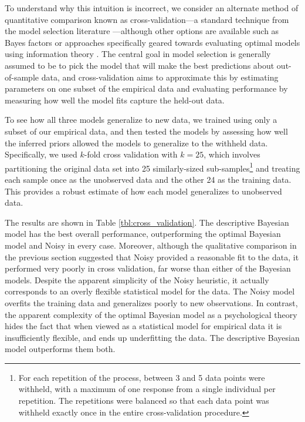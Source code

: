 To understand why this intuition is incorrect, we consider an alternate method of quantitative comparison known as cross-validation---a standard technique from the model selection literature \cite{browne_cross-validation_2000}---although other options are available such as Bayes factors \cite{wasserman2000bayesian} or approaches specifically geared towards evaluating optimal models using information theory \cite{shen2016}. The central goal in model selection is generally assumed to be to pick the model that will make the best predictions about out-of-sample data, and cross-validation aims to approximate this by estimating parameters on one subset of the empirical data and evaluating performance by measuring how well the model fits capture the held-out data. 

To see how all three models generalize to new data, we trained using only a subset of our empirical data, and then tested the models by assessing how well the inferred priors allowed the models to generalize to the withheld data. Specifically, we used $k$-fold cross validation with $k=25$, which involves partitioning the original data set into 25 similarly-sized sub-samples\footnote{For each repetition of the process, between 3 and 5 data points were withheld, with a maximum of one response from a single individual per repetition. The repetitions were balanced so that each data point was withheld exactly once in the entire cross-validation procedure.} and treating each sample once as the unobserved data and the other 24 as the training data. This provides a robust estimate of how each model generalizes to unobserved data.  

The results are shown in Table \ref{tbl:cross_validation}. The descriptive Bayesian model has the best overall performance, outperforming the optimal Bayesian model and Noisy \mink in every case. Moreover, although the qualitative comparison in the previous section suggested that Noisy \mink provided a reasonable fit to the data, it performed very poorly in cross validation, far worse than either of the Bayesian models. Despite the apparent simplicity of the Noisy \mink heuristic, it actually corresponds to an overly flexible statistical model for the data. The Noisy \mink model overfits the training data and generalizes poorly to new observations. In contrast, the apparent complexity of the optimal Bayesian model as a psychological theory hides the fact that when viewed as a statistical model for empirical data it is insufficiently flexible, and ends up underfitting the data. The descriptive Bayesian model outperforms them both.


